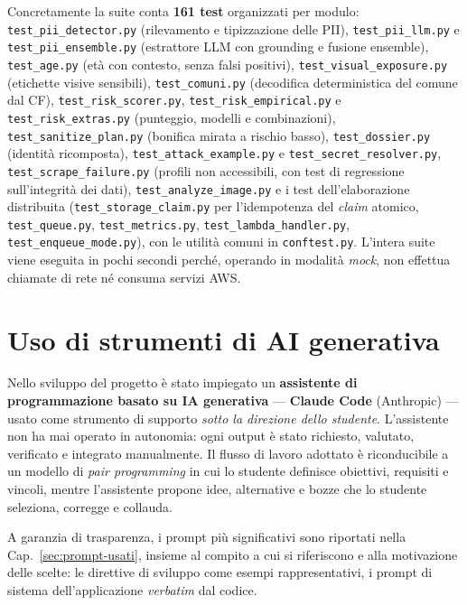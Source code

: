 \documentclass[11pt,a4paper]{article}
\begin{document}
Concretamente la suite conta \textbf{161 test} organizzati per modulo:
\texttt{test\_pii\_detector.py} (rilevamento e tipizzazione delle PII),
\texttt{test\_pii\_llm.py} e \texttt{test\_pii\_ensemble.py} (estrattore LLM con grounding e
fusione ensemble), \texttt{test\_age.py} (età con contesto, senza falsi positivi),
\texttt{test\_visual\_exposure.py} (etichette visive sensibili), \texttt{test\_comuni.py}
(decodifica deterministica del comune dal CF), \texttt{test\_risk\_scorer.py},
\texttt{test\_risk\_empirical.py} e \texttt{test\_risk\_extras.py} (punteggio, modelli e
combinazioni), \texttt{test\_sanitize\_plan.py} (bonifica mirata a rischio basso),
\texttt{test\_dossier.py} (identità ricomposta), \texttt{test\_attack\_example.py} e
\texttt{test\_secret\_resolver.py}, \texttt{test\_scrape\_failure.py} (profili non
accessibili, con test di regressione sull'integrità dei dati), \texttt{test\_analyze\_image.py}
e i test dell'elaborazione distribuita (\texttt{test\_storage\_claim.py} per l'idempotenza
del \emph{claim} atomico, \texttt{test\_queue.py}, \texttt{test\_metrics.py},
\texttt{test\_lambda\_handler.py}, \texttt{test\_enqueue\_mode.py}), con le utilità comuni in
\texttt{conftest.py}.
L'intera suite viene eseguita in pochi secondi perché, operando in modalità \emph{mock},
non effettua chiamate di rete né consuma servizi AWS.

\section{Uso di strumenti di AI generativa}
\label{sec:ai}
Nello sviluppo del progetto è stato impiegato un \textbf{assistente di programmazione
basato su IA generativa} --- \textbf{Claude Code} (Anthropic) --- usato come strumento
di supporto \emph{sotto la direzione dello studente}. L'assistente non ha mai operato in
autonomia: ogni output è stato richiesto, valutato, verificato e integrato manualmente.
Il flusso di lavoro adottato è riconducibile a un modello di \emph{pair programming} in
cui lo studente definisce obiettivi, requisiti e vincoli, mentre l'assistente propone
idee, alternative e bozze che lo studente seleziona, corregge e collauda.

A garanzia di trasparenza, i prompt più significativi sono riportati nella
Cap.~\ref{sec:prompt-usati}, insieme al compito a cui si riferiscono e alla motivazione delle
scelte: le direttive di sviluppo come esempi rappresentativi, i prompt di sistema
dell'applicazione \emph{verbatim} dal codice.
\end{document}
